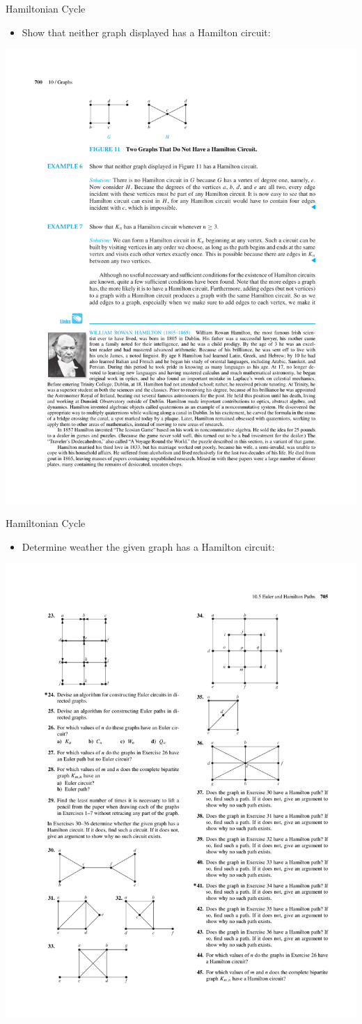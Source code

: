 \documentclass{beamer}
\theoremstyle{definition}
\begin{document}
\begin{frame}{Hamiltonian Cycle}
   \begin{itemize}
        \item Show that neither graph displayed has a Hamilton circuit:
    \end{itemize}
    \centering \includegraphics[trim={5cm 23cm 10cm 2cm},clip,width=.8\linewidth]{p700}
\end{frame}

\begin{frame}{Hamiltonian Cycle}
   \begin{itemize}
        \item Determine weather the given graph has a Hamilton circuit:
    \end{itemize}
    \centering \includegraphics[trim={3.1cm 5cm 15.4cm 20cm},clip,width=.5\linewidth]{p705}
\end{frame}
\end{document}
